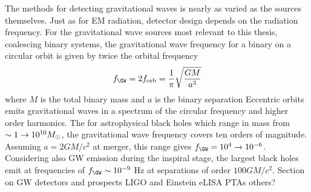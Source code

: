 The methods for detecting gravitational waves is nearly as varied as the sources themselves. Just as for EM radiation, detector design depends on the radiation frequency. For the gravitational wave sources most relevant to this thesis, coalescing binary systems, the gravitational wave frequency for a binary on a circular orbit is given by twice the orbital frequency
\begin{equation}
f_{\GW} = 2 f_{\orb} =  \frac{1}{\pi} \sqrt{\frac{G M }{a^3}}
\end{equation}
where $M$ is the total binary mass and $a$ is the binary separation Eccentric orbits emits gravitational waves in a spectrum of the circular frequency and higher order harmonics. The for astrophysical black holes which range in mass from $\sim 1 \rightarrow 10^{10} {M_{\odot}}$, the gravitational wave frequency covers ten orders of magnitude. Assuming $a = 2GM/c^2$ at merger, this range gives $f_{\GW} = 10^4 \rightarrow 10^{-6}$. Considering also GW emission during the inspiral stage, the largest black holes emit at frequencies of $f_{\GW} \sim 10^{-9}$ Hz at separations of order $100 GM/c^2$.
Section on GW detectors and prospects
LIGO and Einstein
eLISA
PTAs
others?














